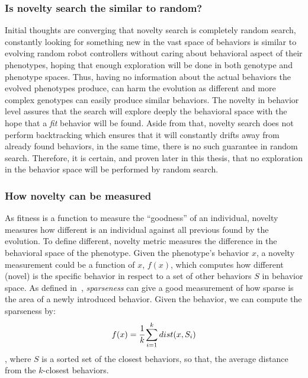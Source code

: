 \subsubsection*{Is novelty search the similar to random?}

Initial thoughts are converging that novelty search is completely random search, constantly looking for something new in the vast space of behaviors is similar to evolving random robot controllers without caring about behavioral aspect of their phenotypes, hoping that enough exploration will be done in both genotype and phenotype spaces. Thus, having no information about the actual behaviors the evolved phenotypes produce, can harm the evolution as different and more complex genotypes can easily produce similar behaviors. The novelty in behavior level assures that the search will explore deeply the behavioral space with the hope that a \emph{fit} behavior will be found. Aside from that, novelty search does not perform backtracking which ensures that it will constantly drifts away from already found behaviors, in the same time, there is no such guarantee in random search. Therefore, it is certain, and proven later in this thesis, that no exploration in the behavior space will be performed by random search.



\subsubsection*{How novelty can be measured}

As fitness is a function to measure the ``goodness'' of an individual, novelty measures how different is an individual against all previous found by the evolution. To define different, novelty metric measures the difference in the behavioral space of the phenotype. Given the phenotype's behavior $x$, a novelty measurement could be a function of $x$, $f(x)$, which computes how different (novel) is the specific behavior in respect to a set of other behaviors $S$ in behavior space.  As defined in~\cite{lehman2008exploiting,lehman2011abandoning}, \emph{sparseness} can give a good measurement of how sparse is the area of a newly introduced behavior. Given the behavior, we can compute the sparseness by:
\begin{equation}
\label{sparsenessEquation}
f(x) = \cfrac{1}{k} \sum_{i=1}^{k} dist(x, S_i)
\end{equation}
, where $S$ is a sorted set of the closest behaviors, so that, the average distance from the $k$-closest behaviors.


